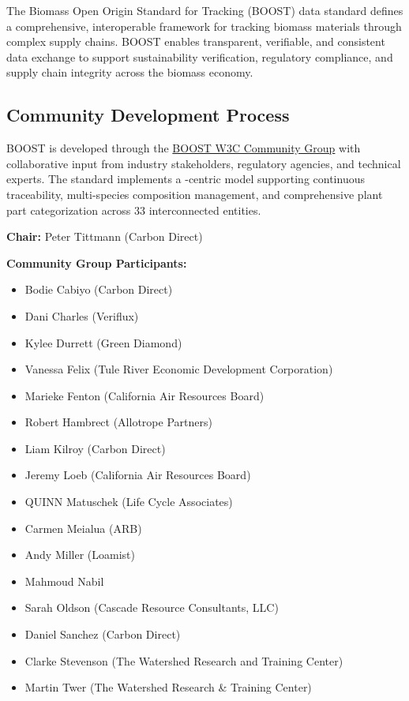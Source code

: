 
The Biomass Open Origin Standard for Tracking (BOOST) data standard defines a comprehensive, interoperable framework for tracking biomass materials through complex supply chains. BOOST enables transparent, verifiable, and consistent data exchange to support sustainability verification, regulatory compliance, and supply chain integrity across the biomass economy.

\subsection{Community Development Process}
\label{sec:community-development-process}

BOOST is developed through the \href{https://www.w3.org/community/boost-01/}{BOOST W3C Community Group} with collaborative input from industry stakeholders, regulatory agencies, and technical experts. The standard implements a \TRU-centric model supporting continuous traceability, multi-species composition management, and comprehensive plant part categorization across 33 interconnected entities.

\begin{informative}[title=Working Group Members]
\textbf{Chair:} Peter Tittmann (Carbon Direct)

\textbf{Community Group Participants:}
\begin{itemize}
    \item Bodie Cabiyo (Carbon Direct)
    \item Dani Charles (Veriflux)
    \item Kylee Durrett (Green Diamond)
    \item Vanessa Felix (Tule River Economic Development Corporation)
    \item Marieke Fenton (California Air Resources Board)
    \item Robert Hambrect (Allotrope Partners)
    \item Liam Kilroy (Carbon Direct)
    \item Jeremy Loeb (California Air Resources Board)
    \item QUINN Matuschek (Life Cycle Associates)
    \item Carmen Meialua (ARB)
    \item Andy Miller (Loamist)
    \item Mahmoud Nabil
    \item Sarah Oldson (Cascade Resource Consultants, LLC)
    \item Daniel Sanchez (Carbon Direct)
    \item Clarke Stevenson (The Watershed Research and Training Center)
    \item Martin Twer (The Watershed Research \& Training Center)
\end{itemize}
\end{informative}


